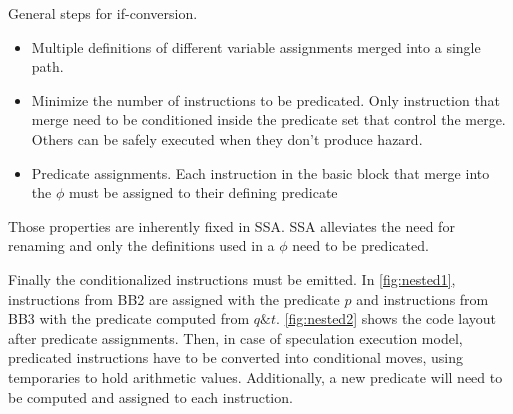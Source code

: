 General steps for if-conversion.

\begin{itemize}
\item Multiple definitions of different variable assignments merged into a single path. 
\item Minimize the number of instructions to be predicated. Only instruction that merge need to be conditioned inside the predicate set that control the merge. Others can be safely executed when they don't produce hazard. 
\item Predicate assignments. Each instruction in the basic block that merge into the $\phi$ must be assigned to their defining predicate
\end {itemize}

Those properties are inherently fixed in SSA. SSA alleviates the need for renaming and only the definitions used in a $\phi$ need to be predicated. 

Finally the conditionalized instructions must be emitted. In \ref{fig:nested1}, instructions from BB2 are assigned with the predicate $p$ and instructions from BB3 with the predicate computed from $q\&t$. \ref{fig:nested2} shows the code layout after predicate assignments. Then, in case of speculation execution model, predicated instructions have to be converted into conditional moves, using temporaries to hold arithmetic values. Additionally, a new predicate will need to be computed and assigned to each instruction.

